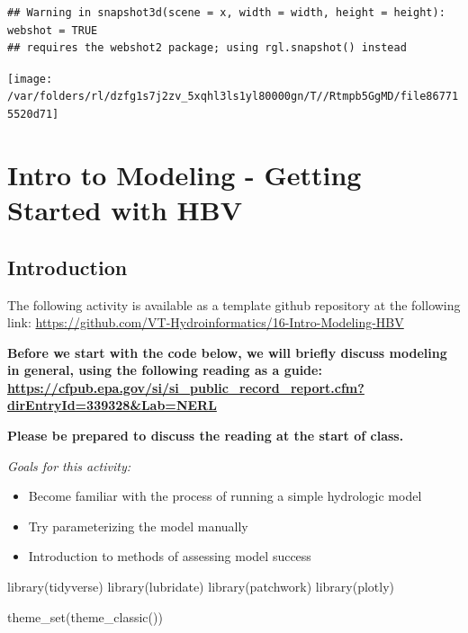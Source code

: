 \documentclass[
]{book}
\newenvironment{Shaded}{\begin{snugshade}}{\end{snugshade}}
\newcommand{\FunctionTok}[1]{\textcolor[rgb]{0.00,0.00,0.00}{#1}}
\newcommand{\NormalTok}[1]{#1}
\providecommand{\tightlist}{%
  \setlength{\itemsep}{0pt}\setlength{\parskip}{0pt}}
\begin{document}
\begin{verbatim}
## Warning in snapshot3d(scene = x, width = width, height = height): webshot = TRUE
## requires the webshot2 package; using rgl.snapshot() instead
\end{verbatim}

\texttt{[image: /var/folders/rl/dzfg1s7j2zv\_5xqhl3ls1yl80000gn/T//Rtmpb5GgMD/file867715520d71]}

\hypertarget{modelingintro}{%
\chapter{Intro to Modeling - Getting Started with HBV}\label{modelingintro}}

\hypertarget{introduction-4}{%
\section{Introduction}\label{introduction-4}}

The following activity is available as a template github repository at the following link: \url{https://github.com/VT-Hydroinformatics/16-Intro-Modeling-HBV}

\textbf{Before we start with the code below, we will briefly discuss modeling in general, using the following reading as a guide: \url{https://cfpub.epa.gov/si/si_public_record_report.cfm?dirEntryId=339328\&Lab=NERL}}

\textbf{Please be prepared to discuss the reading at the start of class.}

\emph{Goals for this activity:}

\begin{itemize}
\tightlist
\item
  Become familiar with the process of running a simple hydrologic model
\item
  Try parameterizing the model manually
\item
  Introduction to methods of assessing model success
\end{itemize}

\begin{Shaded}
\begin{Highlighting}[]
\FunctionTok{library}\NormalTok{(tidyverse)}
\FunctionTok{library}\NormalTok{(lubridate)}
\FunctionTok{library}\NormalTok{(patchwork)}
\FunctionTok{library}\NormalTok{(plotly)}

\FunctionTok{theme\_set}\NormalTok{(}\FunctionTok{theme\_classic}\NormalTok{())}
\end{Highlighting}
\end{Shaded}
\end{document}
